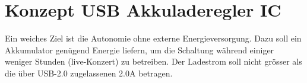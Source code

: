 \section{Konzept USB Akkuladeregler IC}
\label{sec:Konzept_Charger}

Ein weiches Ziel ist die Autonomie ohne externe Energieversorgung. Dazu soll ein Akkumulator genügend Energie liefern, um die Schaltung während einiger weniger Stunden (live-Konzert) zu betreiben. Der Ladestrom soll nicht grösser als die über USB-2.0 zugelassenen 2.0A betragen.




